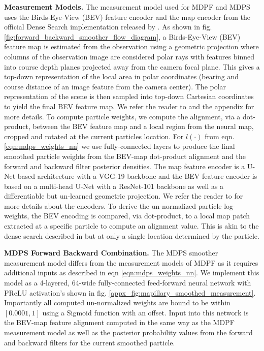         

        \textbf{Measurement Models.} The measurement model used for MDPF and MDPS uses the Birds-Eye-View (BEV) feature encoder and the map encoder from the official Dense Search implementation released by \citet{sarlin2023orienternet}. As shown in fig. \ref{fig:forward_backward_smoother_flow_diagram}, a Birds-Eye-View (BEV) feature map is estimated from the observation using a geometric projection \cite{sarlin2023orienternet} where columns of the observation image are considered polar rays with features binned into course depth planes projected away from the camera focal plane. This gives a top-down representation of the local area in polar coordinates (bearing and course distance of an image feature from the camera center). The polar representation of the scene is then sampled into top-down Cartesian coordinates to yield the final BEV feature map.  We refer the reader to \citet{sarlin2023orienternet} and the appendix for more details. To compute particle weights, we compute the alignment, via a dot-product, between the BEV feature map and a local region from the neural map, cropped and rotated at the current particles location. For $l(\cdot)$ from eqn. \ref{eqn:mdps_weights_nn} we use fully-connected layers to produce the final smoothed particle weights from the BEV-map dot-product alignment and the forward and backward filter posterior densities. The map feature encoder is a U-Net based architecture with a VGG-19 \cite{DBLP:journals/corr/SimonyanZ14a_VGG} backbone and the BEV feature encoder is based on a multi-head U-Net with a ResNet-101 \cite{He2015DeepRL} backbone as well as a differentiable but un-learned geometric projection. We refer the reader to \citet{sarlin2023orienternet} for more details about the encoders. To derive the un-normalized particle log-weights, the BEV encoding is compared, via dot-product, to a local map patch extracted at a specific particle to compute an alignment value. This is akin to the dense search described in \citet{sarlin2023orienternet} but  at only a single location determined by the particle.


        \textbf{MDPS Forward Backward Combination.} The MDPS smoother measurement model differs from the measurement models of MDPF as it requires additional inputs as described in eqn \ref{eqn:mdps_weights_nn}.  We implement this model as a 4-layered, 64-wide fully-connected feed-forward neural network with PReLU \cite{He2015DelvingDI_PRELU} activation's shown in fig. \ref{appx_fig:mapillary_smoothed_measurement}. Importantly all computed un-normalized weights are bound to be within $[0.0001, 1]$ using a Sigmoid function with an offset. Input into this network is the BEV-map feature alignment computed in the same way as the MDPF measurement model as well as the posterior probability values from the forward and backward filters for the current smoothed particle.

